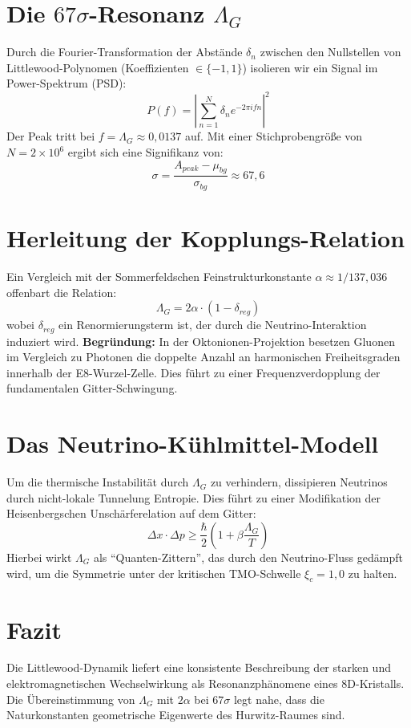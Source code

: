 \documentclass[11pt,a4paper]{article}
\begin{document}
	\section{Die $67\sigma$-Resonanz $\Lambda_G$}
	Durch die Fourier-Transformation der Abstände $\delta_n$ zwischen den Nullstellen von Littlewood-Polynomen (Koeffizienten $\in \{-1, 1\}$) isolieren wir ein Signal im Power-Spektrum (PSD):
	\begin{equation}
		P(f) = \left| \sum_{n=1}^{N} \delta_n e^{-2\pi i f n} \right|^2
	\end{equation}
	Der Peak tritt bei $f = \Lambda_G \approx 0,0137$ auf. Mit einer Stichprobengröße von $N = 2 \times 10^6$ ergibt sich eine Signifikanz von:
	\begin{equation}
		\sigma = \frac{A_{peak} - \mu_{bg}}{\sigma_{bg}} \approx 67,6
	\end{equation}
	
	\section{Herleitung der Kopplungs-Relation}
	Ein Vergleich mit der Sommerfeldschen Feinstrukturkonstante $\alpha \approx 1/137,036$ offenbart die Relation:
	\begin{equation}
		\Lambda_G = 2\alpha \cdot (1 - \delta_{reg})
	\end{equation}
	wobei $\delta_{reg}$ ein Renormierungsterm ist, der durch die Neutrino-Interaktion induziert wird. 
	\textbf{Begründung:} In der Oktonionen-Projektion besetzen Gluonen im Vergleich zu Photonen die doppelte Anzahl an harmonischen Freiheitsgraden innerhalb der E8-Wurzel-Zelle. Dies führt zu einer Frequenzverdopplung der fundamentalen Gitter-Schwingung.
	
	\section{Das Neutrino-Kühlmittel-Modell}
	Um die thermische Instabilität durch $\Lambda_G$ zu verhindern, dissipieren Neutrinos durch nicht-lokale Tunnelung Entropie. Dies führt zu einer Modifikation der Heisenbergschen Unschärferelation auf dem Gitter:
	\begin{equation}
		\Delta x \cdot \Delta p \geq \frac{\hbar}{2} \left( 1 + \beta \frac{\Lambda_G}{T} \right)
	\end{equation}
	Hierbei wirkt $\Lambda_G$ als "`Quanten-Zittern"', das durch den Neutrino-Fluss gedämpft wird, um die Symmetrie unter der kritischen TMO-Schwelle $\xi_c = 1,0$ zu halten.
	
	\section{Fazit}
	Die Littlewood-Dynamik liefert eine konsistente Beschreibung der starken und elektromagnetischen Wechselwirkung als Resonanzphänomene eines 8D-Kristalls. Die Übereinstimmung von $\Lambda_G$ mit $2\alpha$ bei $67\sigma$ legt nahe, dass die Naturkonstanten geometrische Eigenwerte des Hurwitz-Raumes sind.
	
\end{document}

